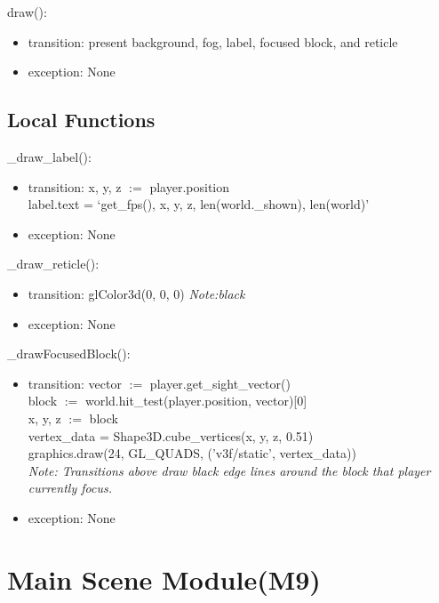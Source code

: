 \documentclass{article}
\begin{document}
\noindent draw():
\begin{itemize}
\item transition: present background, fog, label, focused block, and reticle
\item exception: None
\end{itemize}\vspace{6mm}

\subsection{Local Functions}

\noindent \_draw\_label():
\begin{itemize}
\item transition: x, y, z $:=$ player.position\\
label.text = `get\_fps(), x, y, z, len(world.\_shown), len(world)'
\item exception: None
\end{itemize}\vspace{6mm}

\noindent \_draw\_reticle():
\begin{itemize}
\item transition: glColor3d(0, 0, 0) \textit{Note:black}
\item exception: None
\end{itemize}\vspace{6mm}

\noindent \_drawFocusedBlock():
\begin{itemize}
\item transition: vector $:=$ player.get\_sight\_vector()\\
block $:=$ world.hit\_test(player.position, vector)[0]\\
x, y, z $:=$ block\\
vertex\_data = Shape3D.cube\_vertices(x, y, z, 0.51)\\
graphics.draw(24, GL\_QUADS, ('v3f/static', vertex\_data))\\
\textit{Note: Transitions above draw black edge lines around the block that player currently focus.}
\item exception: None
\end{itemize}\vspace{6mm}
\newpage


\section {Main Scene Module(M9)}
\end{document}
